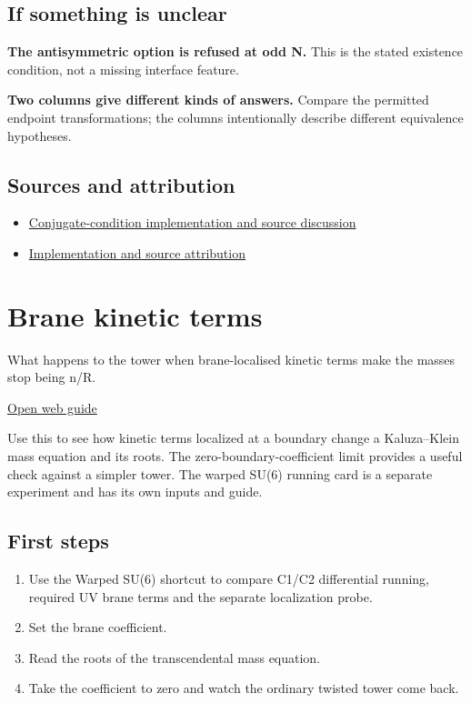 \documentclass[11pt,a4paper]{article}
\begin{document}
\subsection*{If something is unclear}
\textbf{The antisymmetric option is refused at odd N.} This is the stated existence condition, not a missing interface feature.

\textbf{Two columns give different kinds of answers.} Compare the permitted endpoint transformations; the columns intentionally describe different equivalence hypotheses.

\subsection*{Sources and attribution}
\begin{itemize}
\item \href{https://github.com/karlesmarin/ghu-lab/blob/main/src/modules/cbclass.mjs}{Conjugate-condition implementation and source discussion}
\item \href{https://github.com/karlesmarin/ghu-lab/blob/main/src/sections/cbclass_section.js}{Implementation and source attribution}
\end{itemize}
\section{Brane kinetic terms}
What happens to the tower when brane-localised kinetic terms make the masses stop being n/R.

\href{https://karlesmarin.github.io/ghu-explorer/guide/blkt/index.html}{Open web guide}

Use this to see how kinetic terms localized at a boundary change a Kaluza--Klein mass equation and its roots. The zero-boundary-coefficient limit provides a useful check against a simpler tower. The warped SU(6) running card is a separate experiment and has its own inputs and guide.
\subsection*{First steps}
\begin{enumerate}
\item Use the Warped SU(6) shortcut to compare C1/C2 differential running, required UV brane terms and the separate localization probe.
\item Set the brane coefficient.
\item Read the roots of the transcendental mass equation.
\item Take the coefficient to zero and watch the ordinary twisted tower come back.
\end{enumerate}
\end{document}
